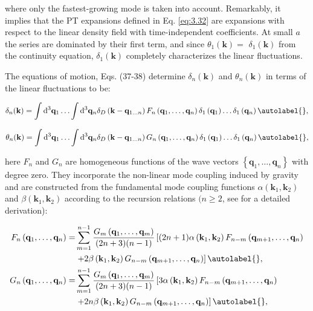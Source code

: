 where only the fastest-growing mode is taken into account. Remarkably, it implies that the PT expansions defined in Eq. \eqref{eq:3.32} are expansions with respect to the linear density field with time-independent coefficients. At small $a$ the series are dominated by their first term, and since $\theta_{1}(\mathbf{k})=$ $\delta_{1}(\mathbf{k})$ from the continuity equation, $\delta_{1}(\mathbf{k})$ completely characterizes the linear fluctuations.

The equations of motion, Eqs. (37-38) determine $\delta_{n}(\mathbf{k})$ and $\theta_{n}(\mathbf{k})$ in terms of the linear fluctuations to be:


\begin{equation}
    \delta_{n}(\mathbf{k})=\int \mathrm{d}^{3} \mathbf{q}_{1} \ldots \int \mathrm{d}^{3} \mathbf{q}_{n} \delta_{D}\left(\mathbf{k}-\mathbf{q}_{1 \ldots n}\right) F_{n}\left(\mathbf{q}_{1}, \ldots, \mathbf{q}_{n}\right) \delta_{1}\left(\mathbf{q}_{1}\right) \ldots \delta_{1}\left(\mathbf{q}_{n}\right) \autolabel{},
\end{equation}



\begin{equation}
    \theta_{n}(\mathbf{k})=\int \mathrm{d}^{3} \mathbf{q}_{1} \ldots \int \mathrm{d}^{3} \mathbf{q}_{n} \delta_{D}\left(\mathbf{k}-\mathbf{q}_{1 \ldots n}\right) G_{n}\left(\mathbf{q}_{1}, \ldots, \mathbf{q}_{n}\right) \delta_{1}\left(\mathbf{q}_{1}\right) \ldots \delta_{1}\left(\mathbf{q}_{n}\right) \autolabel{},
\end{equation}


here $F_{n}$ and $G_{n}$ are homogeneous functions of the wave vectors $\left\{\mathbf{q}_{1}, \ldots, \mathbf{q}_{n}\right\}$ with degree zero. They incorporate the non-linear mode coupling induced by gravity and are constructed from the fundamental mode coupling functions $\alpha\left(\mathbf{k}_{1}, \mathbf{k}_{2}\right)$ and $\beta\left(\mathbf{k}_{1}, \mathbf{k}_{2}\right)$ according to the recursion relations  $(n \geq 2$, see \cite{Goroff1986ApJ...311....6G, Jain_1994} for a detailed derivation):


\begin{align*}
    F_{n}\left(\mathbf{q}_{1}, \ldots, \mathbf{q}_{n}\right)= & \sum_{m=1}^{n-1} \frac{G_{m}\left(\mathbf{q}_{1}, \ldots, \mathbf{q}_{m}\right)}{(2 n+3)(n-1)}\left[(2 n+1) \alpha\left(\mathbf{k}_{1}, \mathbf{k}_{2}\right) F_{n-m}\left(\mathbf{q}_{m+1}, \ldots, \mathbf{q}_{n}\right)\right. \\
    & \left.+2 \beta\left(\mathbf{k}_{1}, \mathbf{k}_{2}\right) G_{n-m}\left(\mathbf{q}_{m+1}, \ldots, \mathbf{q}_{n}\right)\right]  \autolabel{},\\
    G_{n}\left(\mathbf{q}_{1}, \ldots, \mathbf{q}_{n}\right)= & \sum_{m=1}^{n-1} \frac{G_{m}\left(\mathbf{q}_{1}, \ldots, \mathbf{q}_{m}\right)}{(2 n+3)(n-1)}\left[3 \alpha\left(\mathbf{k}_{1}, \mathbf{k}_{2}\right) F_{n-m}\left(\mathbf{q}_{m+1}, \ldots, \mathbf{q}_{n}\right)\right. \\
    & \left.+2 n \beta\left(\mathbf{k}_{1}, \mathbf{k}_{2}\right) G_{n-m}\left(\mathbf{q}_{m+1}, \ldots, \mathbf{q}_{n}\right)\right] \autolabel{},
\end{align*}


